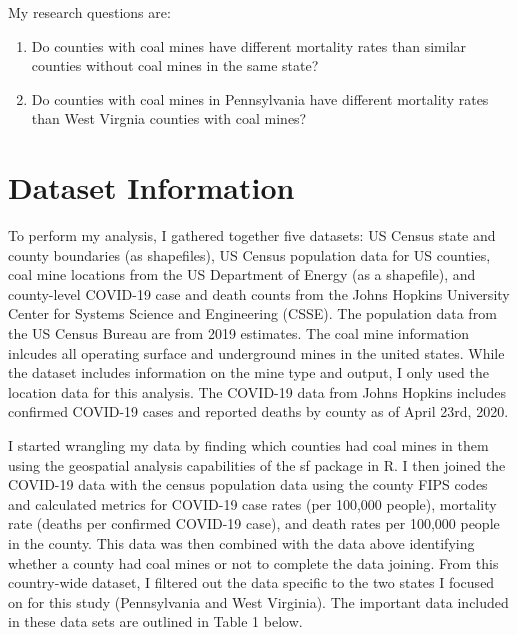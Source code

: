 \documentclass[
  12pt,
]{article}
\begin{document}
My research questions are:

\begin{enumerate}
\def\labelenumi{\arabic{enumi}.}
\item
  Do counties with coal mines have different mortality rates than
  similar counties without coal mines in the same state?
\item
  Do counties with coal mines in Pennsylvania have different mortality
  rates than West Virgnia counties with coal mines?
\end{enumerate}

\newpage

\hypertarget{dataset-information}{%
\section{Dataset Information}\label{dataset-information}}

To perform my analysis, I gathered together five datasets: US Census
state and county boundaries (as shapefiles), US Census population data
for US counties, coal mine locations from the US Department of Energy
(as a shapefile), and county-level COVID-19 case and death counts from
the Johns Hopkins University Center for Systems Science and Engineering
(CSSE). The population data from the US Census Bureau are from 2019
estimates. The coal mine information inlcudes all operating surface and
underground mines in the united states. While the dataset includes
information on the mine type and output, I only used the location data
for this analysis. The COVID-19 data from Johns Hopkins includes
confirmed COVID-19 cases and reported deaths by county as of April 23rd,
2020.

I started wrangling my data by finding which counties had coal mines in
them using the geospatial analysis capabilities of the sf package in R.
I then joined the COVID-19 data with the census population data using
the county FIPS codes and calculated metrics for COVID-19 case rates
(per 100,000 people), mortality rate (deaths per confirmed COVID-19
case), and death rates per 100,000 people in the county. This data was
then combined with the data above identifying whether a county had coal
mines or not to complete the data joining. From this country-wide
dataset, I filtered out the data specific to the two states I focused on
for this study (Pennsylvania and West Virginia). The important data
included in these data sets are outlined in Table 1 below.
\end{document}
